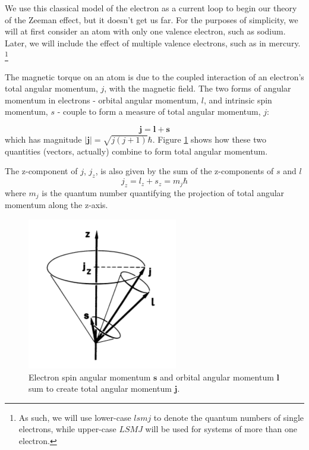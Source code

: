 \documentclass[twocolumn]{article}
\begin{document}
		We use this classical model of the electron as a current loop to begin our theory of the Zeeman effect, but it doesn't get us far.
		For the purposes of simplicity, we will at first consider an atom with only one valence electron, such as sodium.
		Later, we will include the effect of multiple valence electrons, such as in mercury.
		\footnote{As such, we will use lower-case $lsmj$ to denote the quantum numbers of single electrons, while upper-case $LSMJ$ will be used for systems of more than one electron.}
		
		The magnetic torque on an atom is due to the coupled interaction of an electron's total angular momentum, $j$, with the magnetic field.
		The two forms of angular momentum in electrons - orbital angular momentum, $l$, and intrinsic spin momentum, $s$ - couple to form a measure of total angular momentum, $j$:
		
		\begin{equation}
		\mathbf{j} = \mathbf{l} + \mathbf{s}
		\label{eq:TotalAngularP}
		\end{equation}
		which has magnitude $\left|\mathbf{j}\right| = \sqrt{j\left(j+1\right)}\hbar$.
		Figure \ref{fig:TotalAngularMomentumDiagram} shows how these two quantities (vectors, actually) combine to form total angular momentum.
		
		The z-component of $j$, $j_z$, is also given by the sum of the z-components of $s$ and $l$
		\begin{equation}
			j_z = l_z + s_z = m_j\hbar
		\end{equation}
		where $m_j$ is the quantum number quantifying the projection of total angular momentum along the z-axis.
		
		\begin{figure}
			\centering
			\includegraphics[width=0.7\linewidth]{Images/TotalAngularMomentumDiagram}
			\caption{Electron spin angular momentum $\mathbf{s}$ and orbital angular momentum $\mathbf{l}$ sum to create total angular momentum $\mathbf{j}$.\cite{stoltenberg_zeeman_2007}}
			\label{fig:TotalAngularMomentumDiagram}
		\end{figure}
\end{document}
